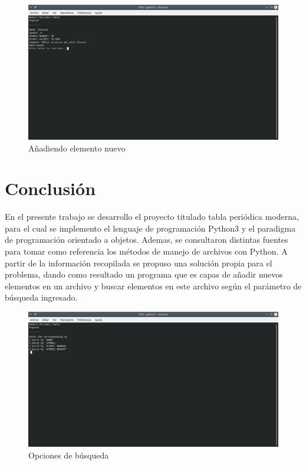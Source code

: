 \documentclass[conference]{IEEEtran}
\begin{document}
\begin{figure}[h!]
\includegraphics[width=1 \columnwidth]{cap_02.png}
\caption{Añadiendo elemento nuevo}
\label{img:02}
\end{figure}





\section{Conclusión}
En el presente trabajo se desarrollo el proyecto titulado tabla periódica moderna, para el cual se implemento el lenguaje de programación Python3 y el paradigma de programación orientado a objetos. Ademas, se consultaron distintas fuentes\cite{proPy} para tomar como referencia los métodos de manejo de archivos con Python. A partir de la información recopilada se propuso una solución propia para el problema, dando como resultado un programa que es capas de añadir nuevos elementos en un archivo y buscar elementos en este archivo según el parámetro de búsqueda ingresado.

\begin{figure}[h!]
\includegraphics[width=1 \columnwidth]{cap_03.png}
\caption{Opciones de búsqueda}
\label{img:03}
\end{figure}
\end{document}
